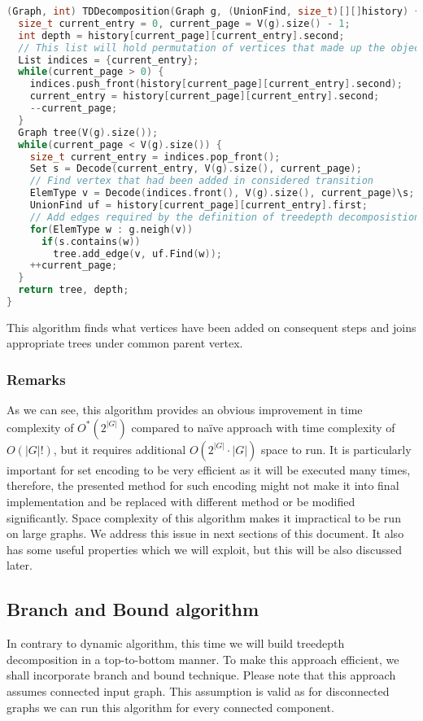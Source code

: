 \begin{lstlisting}[language=C++]
(Graph, int) TDDecomposition(Graph g, (UnionFind, size_t)[][]history) {
  size_t current_entry = 0, current_page = V(g).size() - 1;
  int depth = history[current_page][current_entry].second;
  // This list will hold permutation of vertices that made up the object in history[current_page][current_entry]
  List indices = {current_entry};
  while(current_page > 0) {
    indices.push_front(history[current_page][current_entry].second);
    current_entry = history[current_page][current_entry].second;
    --current_page;
  }
  Graph tree(V(g).size());
  while(current_page < V(g).size()) {
    size_t current_entry = indices.pop_front();
    Set s = Decode(current_entry, V(g).size(), current_page);
    // Find vertex that had been added in considered transition
    ElemType v = Decode(indices.front(), V(g).size(), current_page)\s;
    UnionFind uf = history[current_page][current_entry].first;
    // Add edges required by the definition of treedepth decomposistion
    for(ElemType w : g.neigh(v))
      if(s.contains(w))
        tree.add_edge(v, uf.Find(w));
    ++current_page;
  }
  return tree, depth;
}
\end{lstlisting}
This algorithm finds what vertices have been added on consequent steps and joins appropriate trees under common parent vertex.
\subsubsection{Remarks}
As we can see, this algorithm provides an obvious improvement in time complexity of $O^{*}\left(2^{\left|G\right|}\right)$ compared to na\"ive approach with time complexity of $O\left(\left|G\right|!\right)$, but it requires additional $O\left(2^{\left|G\right|}\cdot\left|G\right|\right)$ space to run. It is particularly important for set encoding to be very efficient as it will be executed many times, therefore, the presented method for such encoding might not make it into final implementation and be replaced with different method or be modified significantly. Space complexity of this algorithm makes it impractical to be run on large graphs. We address this issue in next sections of this document. It also has some useful properties which we will exploit, but this will be also discussed later.
\subsection{Branch and Bound algorithm}
In contrary to dynamic algorithm, this time we will build treedepth decomposition in a top-to-bottom manner. To make this approach efficient, we shall incorporate branch and bound technique. Please note that this approach assumes connected input graph. This assumption is valid as for disconnected graphs we can run this algorithm for every connected component.
